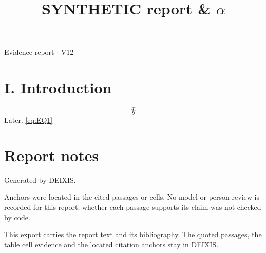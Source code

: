 \documentclass[journal]{IEEEtran}
\begin{document}
\title{SYNTHETIC report \& \ensuremath{\alpha}}

\maketitle

\noindent Evidence report \ensuremath{\cdot} V12

\section*{I. Introduction}

\begin{equation}
\label{eq:EQ1}
x
\end{equation}
\cite{Synth26}
\begin{equation}
\label{eq:EQ2}
y
\end{equation}
\cite{Synth26} Later. \eqref{eq:EQ1} \cite{Synth26}

\section*{Report notes}

Generated by DEIXIS.

Anchors were located in the cited passages or cells. No model or person review is recorded for this report; whether each passage supports its claim was not checked by code.

This export carries the report text and its bibliography. The quoted passages, the table cell evidence and the located citation anchors stay in DEIXIS.




\end{document}
